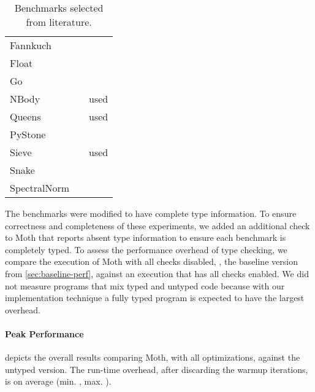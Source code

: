 \begin{table}[htb]
  \caption{Benchmarks selected from literature.}
  \label{tab:gradual-benchmarks}
  \begin{center}
    \begin{tabular}{l l r}
      Fannkuch & \cite{Vitousek2017,Greenman2018} \\
      Float & \cite{Vitousek2017,Muehlboeck2017,Greenman2018} \\
      Go & \cite{Vitousek2017,Muehlboeck2017,Greenman2018} \\
      NBody & \cite{Kuhlenschmidt:2018:preprint,Vitousek2017,Greenman2018} & used \cite{Marr2016} \\
      Queens & \cite{Vitousek2017,Muehlboeck2017,Greenman2018} & used \cite{Marr2016} \\
      PyStone & \cite{Vitousek2017,Muehlboeck2017,Greenman2018} \\
      Sieve & \cite{Takikawa2016,Muehlboeck2017,Bauman2017,Richards2017,Greenman2019jfp} & used \cite{Marr2016} \\
      Snake & \cite{Takikawa2016,Muehlboeck2017,Bauman2017,Richards2017,Greenman2019jfp} \\
      SpectralNorm & \cite{Vitousek2017,Muehlboeck2017,Greenman2018} \\
    \end{tabular}
  \end{center}
\end{table}

The benchmarks were modified to have complete type information.
To ensure correctness and completeness of these experiments,
we added an additional check to Moth that
reports absent type information to ensure each benchmark is completely typed.
To assess the performance overhead of type checking,
we compare the execution of Moth with all checks disabled, \ie, the baseline version from
\cref{sec:baseline-perf}, against an execution that has all checks enabled.
We did not measure programs that mix typed and untyped code
because with our implementation technique a fully typed program is expected to
have the largest overhead.

\paragraph*{Peak Performance}

 depicts
the overall results comparing Moth,
with all optimizations,
against the untyped version.
The run-time overhead,
after discarding the warmup iterations,
is on average
\OverheadTypingGMeanP (min. \OverheadTypingMinP, max. \OverheadTypingMaxP).

